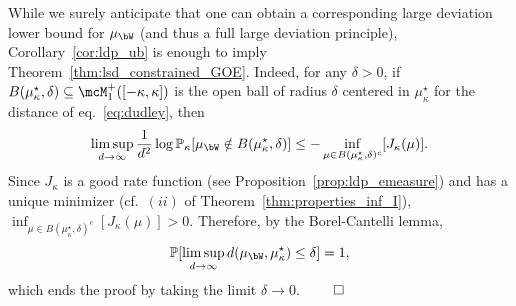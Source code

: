 \noindent
While we surely anticipate that one can obtain a corresponding large deviation lower bound for $\mu_\bW$ (and thus a full large deviation principle), 
Corollary~\ref{cor:ldp_ub} is enough to imply Theorem~\ref{thm:lsd_constrained_GOE}.
Indeed, for any $\delta > 0$, if $B(\mu_\kappa^\star,\delta) \subseteq \mcM_1^+([-\kappa,\kappa])$ is the open ball of radius $\delta$ centered in $\mu_\kappa^\star$ for the distance of eq.~\eqref{eq:dudley}, 
then 
\begin{align*}
    \limsup_{d \to \infty} \frac{1}{d^2} \log \bbP_\kappa[\mu_\bW \notin B(\mu_\kappa^\star, \delta)] \leq - \inf_{\mu \in B(\mu_\kappa^\star, \delta)^c} [J_\kappa(\mu)].
\end{align*}
Since $J_\kappa$ is a good rate function (see Proposition~\ref{prop:ldp_emeasure}) and has a unique minimizer (cf.\ $(ii)$ of Theorem~\ref{thm:properties_inf_I}), 
$\inf_{\mu \in B(\mu_\kappa^\star, \delta)^c} [J_\kappa(\mu)] > 0$. Therefore, by the Borel-Cantelli lemma,
\begin{align*}
    \bbP[\limsup_{d \to \infty} d(\mu_\bW, \mu_\kappa^\star) \leq \delta] = 1,
\end{align*}
which ends the proof by taking the limit $\delta \to 0$.
$\qed$
